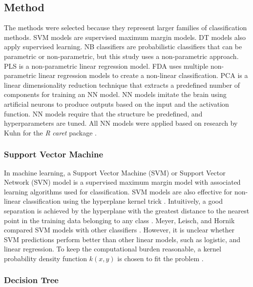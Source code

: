 \let\LaTeXcline\cline\documentclass[sn-mathphys-num]{sn-jnl}\let\cline\LaTeXcline
\begin{document}
\subsection{Method}

The methods were selected because they represent larger families of classification methods. SVM models are supervised maximum margin models. DT models also apply supervised learning. NB classifiers are probabilistic classifiers that can be parametric or non-parametric, but this study uses a non-parametric approach. PLS is a non-parametric linear regression model. FDA uses multiple non-parametric linear regression models to create a non-linear classification. PCA is a linear dimensionality reduction technique that extracts a predefined number of components for training an NN model. NN models imitate the brain using artificial neurons to produce outputs based on the input and the activation function. NN models require that the structure be predefined, and hyperparameters are tuned. All NN models were applied based on research by Kuhn for the \textit{R} \textit{caret} package \cite{Kuhn2007, kuhn2008building, kuhn2013applied}.

\subsubsection{Support Vector Machine}

In machine learning, a Support Vector Machine (SVM) or Support Vector Network (SVN) model is a supervised maximum margin model with associated learning algorithms used for classification. SVM models are also effective for non-linear classification using the hyperplane kernel trick \cite{Boser1992}. Intuitively, a good separation is achieved by the hyperplane with the greatest distance to the nearest point in the training data belonging to any class \cite{HastieRosset2009}. Meyer, Leisch, and Hornik compared SVM models with other classifiers \cite{Meyer2003}. However, it is unclear whether SVM predictions perform better than other linear models, such as logistic, and linear regression. To keep the computational burden reasonable, a kernel probability density function $k(x, y)$ is chosen to fit the problem \cite{Press2007}.

\subsubsection{Decision Tree}
\end{document}
